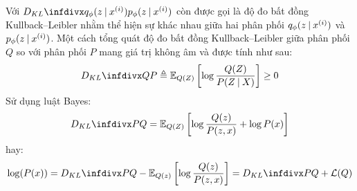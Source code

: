 Với $\Dkl{q_\phi(z \given x^{(i)})}{p_\phi(z \given x^{(i)})}$
còn được gọi là độ đo bất đồng Kullback–Leibler nhằm thể hiện sự khác nhau giữa hai phân phối $q_\phi(z \:\lvert\: x^{(i)})$ và $p_\phi(z \:\lvert\: x^{(i)})$.
Một cách tổng quát độ đo bất đồng Kullback–Leibler giữa phân phối $Q$ so với phân phối $P$ mang giá trị không âm và được tính như sau: 
\begin{align}
\Dkl{Q}{P} \triangleq  \mathbb{E}_{Q(Z)} \left[\log \frac{Q(Z)}{P(Z \given X)}\right] \geq 0
\end{align}
Sử dụng luật Bayes:
\begin{align}
\Dkl{P}{Q} = \mathbb{E}_{Q(Z)} \left[\log \frac{Q(z)}{P(z , x)}  + \log P(x)\right]
\end{align}
hay:
\begin{align}
\log(P(x)) = \Dkl{P}{Q} - \mathbb{E}_{Q(z)} \left[\log \frac{Q(z)}{P(z , x)}\right]
= \Dkl{P}{Q} + \mathcal{L}(Q)
\end{align}

